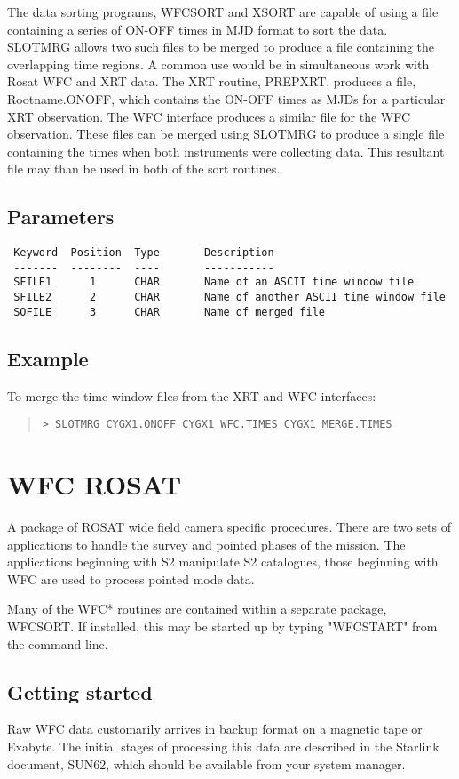 \documentclass{book}
\renewcommand{\_}{{\tt\char'137}}     %
\begin{document}
The data sorting programs, WFCSORT and XSORT are capable of using a
file containing a series of ON-OFF times in MJD format to sort the data.
SLOTMRG allows two such files to be merged to produce a file containing
the overlapping time regions. A common use would be in simultaneous
work with Rosat WFC and XRT data. The XRT routine, PREPXRT, produces a
file, Rootname.ONOFF, which contains the ON-OFF times as MJDs for a
particular XRT observation. The WFC interface produces a similar file
for the WFC observation. These files can be merged using SLOTMRG to
produce a single file containing the times when both instruments were
collecting data. This resultant file may than be used in both of the
sort routines.

\subsection{Parameters}
\begin{verbatim}
 Keyword  Position  Type       Description
 -------  --------  ----       -----------
 SFILE1      1      CHAR       Name of an ASCII time window file
 SFILE2      2      CHAR       Name of another ASCII time window file
 SOFILE      3      CHAR       Name of merged file

\end{verbatim}\subsection{Example}
To merge the time window files from the XRT and WFC interfaces:
\begin{quote}\begin{verbatim}
> SLOTMRG CYGX1.ONOFF CYGX1_WFC.TIMES CYGX1_MERGE.TIMES
\end{verbatim}\end{quote}
\section{WFC ROSAT}
A package of ROSAT wide field camera specific procedures. There are two
sets of applications to handle the survey and pointed phases of the
mission. The applications beginning with S2 manipulate S2 catalogues,
those beginning with WFC are used to process pointed mode data.

Many of the WFC* routines are contained within a separate package, WFCSORT.
If installed, this may be started up by typing "WFCSTART" from the
command line.

\subsection{Getting started}
Raw WFC data customarily arrives in backup format on a
magnetic tape or Exabyte. The initial stages of processing this data are
described in the Starlink document, SUN62, which should be available from
your system manager.
\end{document}
